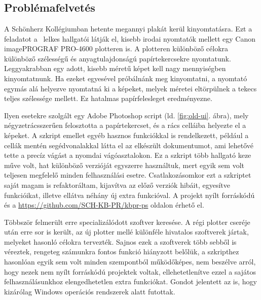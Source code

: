 \chapter{\bevezetes}

\section{Problémafelvetés}

A Schönherz Kollégiumban hetente megannyi plakát kerül kinyomtatásra. Ezt a feladatot a \vik\, lelkes hallgatói látják el, kisebb irodai nyomtatók mellett egy Canon imagePROGRAF PRO-4600 plotteren is. A plotteren különböző célokra különböző szélességű és anyagtulajdonságú papírtekercsekre nyomtatunk. Leggyakrabban egy adott, kisebb méretű képet kell nagy mennyiségben kinyomtatnunk. Ha ezeket egyesével próbálnánk meg kinyomtatni, a nyomtató egymás alá helyezve nyomtatná ki a képeket, melyek méretei eltörpülnek a tekecs teljes szélessége mellett. Ez hatalmas papírfelesleget eredményezne.

Ilyen esetekre szolgált egy Adobe Photoshop script (ld. \ref{fig:old-ui}. ábra), mely négyzetrácsszerűen felosztotta a papírtekercset, és a rács celláiba helyezte el a képeket. A szkript emellet egyéb hasznos funkciókkal is rendelkezett, például a cellák mentén segédvonalakkal látta el az elkészült dokumentumot, ami lehetővé tette a precíz vágást a nyomdai vágóasztalokon.
Ez a szkript több hallgató keze műve volt, hat különböző verzióját egyszerre használtuk, mert egyik sem volt teljesen megfelelő minden felhasználási esetre. Csatlakozásomkor ezt a szkriptet saját magam is refaktoráltam, kijavítva az előző verziók hibáit, egyesítve funkcióikat, illetve ellátva néhány új extra funkcióval. A projekt nyílt forráskódú és a \href{https://github.com/SCH-KB-PR/kbpr-ps}{https://github.com/SCH-KB-PR/kbpr-ps} oldalon érhető el.

Többször felmerült erre specializálódott szoftver keresése.
A régi plotter cseréje után erre sor is került, az új plotter mellé különféle hivatalos szoftverek jártak, melyeket hasonló célokra tervezték. Sajnos ezek a szoftverek több sebből is véreztek, rengeteg számunkra fontos funkció hiányzott belőlük, a szkripthez hasonlóan egyik sem volt minden szempontból működőképes, nem beszélve arról, hogy nezek nem nyílt forráskódú projektek voltak, ellehetetlenítve ezzel a sajátos felhasználásunkhoz elengedhetetlen extra funkciókat. Gondot jelentett az is, hogy kizárólag Windows operációs rendszerek alatt futottak.

